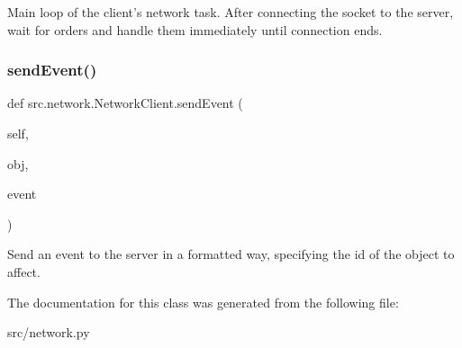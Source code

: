 \begin{DoxyVerb}Main loop of the client's network task.  After connecting the socket
to the server, wait for orders and handle them immediately until
connection ends.
\end{DoxyVerb}
 \hypertarget{classsrc_1_1network_1_1_network_client_a5464ebb5a065e4234703c93bf664f228}{}\label{classsrc_1_1network_1_1_network_client_a5464ebb5a065e4234703c93bf664f228} 
\subsubsection{\texorpdfstring{send\+Event()}{sendEvent()}}
{\footnotesize\ttfamily def src.\+network.\+Network\+Client.\+send\+Event (\begin{DoxyParamCaption}\item[{}]{self,  }\item[{}]{obj,  }\item[{}]{event }\end{DoxyParamCaption})}

\begin{DoxyVerb}Send an event to the server in a formatted way, specifying the id
of the object to affect.
\end{DoxyVerb}
 

The documentation for this class was generated from the following file\+:\begin{DoxyCompactItemize}
\item 
src/network.\+py\end{DoxyCompactItemize}
